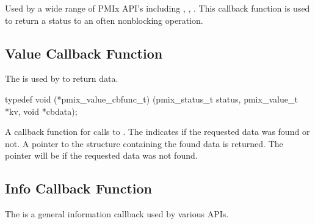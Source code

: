 \begin{arglist}
\end{arglist}

\descr

Used by a wide range of \ac{PMIx} API's including , , .
This callback function is used to return a status to an often nonblocking operation.


\subsection{Value Callback Function}

\summary

The  is used by  to return data.

\cspecificstart
\begin{codepar}
typedef void (*pmix_value_cbfunc_t)
    (pmix_status_t status,
     pmix_value_t *kv, void *cbdata);
\end{codepar}
\cspecificend

\begin{arglist}
\end{arglist}


\descr

A callback function for calls to .
The  indicates if the requested data was found or not.
A pointer to the  structure containing the found data is returned.
The pointer will be  if the requested data was not found.


\subsection{Info Callback Function}

\summary

The  is a general information callback used by various APIs.

